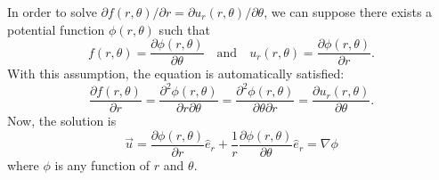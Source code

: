 \documentclass[11pt,]{beamer}
\begin{document}
\begin{frame}
	In order to solve $\partial f(r,\theta)/\partial r = \partial u_r(r,\theta)/\partial \theta$, 
	we can suppose there exists a potential function $\phi(r,\theta)$ such that 
	\begin{equation}
	f(r,\theta) = \frac{\partial \phi(r,\theta)}{\partial \theta}
	\quad \text{and}\quad
	u_{r}(r,\theta) = \frac{\partial \phi(r,\theta)}{\partial r}.
	\end{equation}
	With this assumption, the equation is automatically satisfied:
	\begin{equation*}
	\frac{\partial f(r,\theta)}{\partial r} 
	= \frac{\partial^2 \phi(r,\theta)}{\partial r \partial \theta}
	= \frac{\partial^2 \phi(r,\theta)}{\partial \theta \partial r}
	= \frac{\partial u_r(r,\theta)}{\partial \theta}.
	\end{equation*}
	Now, the solution is 
	\begin{equation}
	\vec{u} = \frac{\partial \phi(r,\theta)}{\partial r} \hat{e}_{r} 
			  + \frac{1}{r}\frac{\partial \phi(r,\theta)}{\partial \theta} \hat{e}_{r} = \nabla\phi
	\end{equation}
	where $\phi$ is any function of $r$ and $\theta$.
\end{frame}
\end{document}
